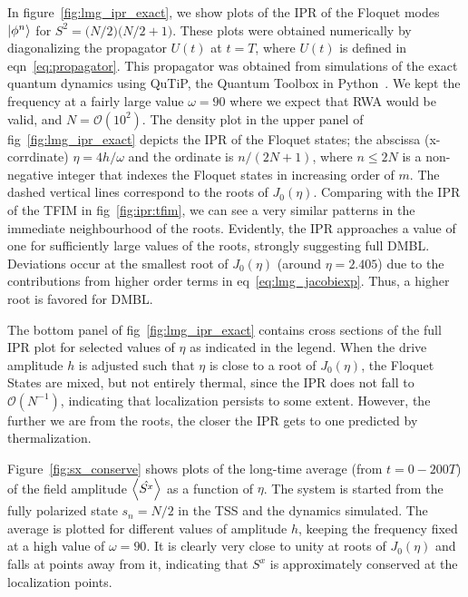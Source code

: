 \documentclass[%
reprint,
superscriptaddress,
amsmath,amssymb,
aps,
prb,
showkeys,
]{revtex4-2}
\begin{document}
	In figure~\ref{fig:lmg_ipr_exact}, we show plots of the IPR of the Floquet modes $\ket{\phi^n}$ for $S^2 = \big(N/2\big)\big(N/2 + 1\big)$.
	These plots were obtained numerically by diagonalizing the propagator $U(t)$ at $t=T$, where $U(t)$ is defined in eqn~\ref{eq:propagator}. This propagator was obtained from simulations of the exact quantum dynamics using QuTiP, the Quantum Toolbox in Python~\cite{qutip}. We kept the frequency at a fairly large value $\omega = 90$ where we expect that RWA would be valid, and $N=\mathcal{O}(10^2)$. The density plot in the upper panel of fig~\ref{fig:lmg_ipr_exact} depicts the IPR of the Floquet states; the abscissa (x-corrdinate)  $\eta=4h/\omega$ and the ordinate is $n/(2N+1)$, where $n\leq 2N$ is a non-negative integer that indexes the Floquet states in increasing order of $m$. The dashed vertical lines correspond to the roots of $J_0(\eta)$. Comparing with the IPR of the TFIM in fig~\ref{fig:ipr:tfim}, we can see a very similar patterns in the immediate neighbourhood of the roots. Evidently, the IPR approaches a value of one for sufficiently large values of the roots, strongly suggesting full DMBL. Deviations occur at the smallest root of $J_0(\eta)$ (around $\eta = 2.405$) due to the contributions from higher order terms in eq~\ref{eq:lmg_jacobiexp}. Thus, a higher root is favored for DMBL.
	
	The bottom panel of fig~\ref{fig:lmg_ipr_exact} contains cross sections of the full IPR plot for selected values of $\eta$ as indicated in the legend. When the drive amplitude $h$ is adjusted such that $\eta$ is close to a root of $J_0(\eta)$, the Floquet States are mixed, but not entirely thermal, since the IPR does not fall to $\mathcal{O}(N^{-1})$, indicating that localization persists to some extent. However, the further we are from the roots, the closer the IPR gets to one predicted by thermalization.
	
	Figure~\ref{fig:sx_conserve} shows plots of the long-time average (from $t=0-200T$) of the field amplitude $\expval{\hat{S^x}}$ as a function of $\eta$. The system is started from the fully polarized state $s_n=N/2$ in the TSS and the dynamics simulated. The average is plotted for different values of amplitude $h$, keeping the frequency fixed at a high value of $\omega=90$. It is clearly very close to unity at roots of $J_0(\eta)$ and falls at points away from it, indicating that $S^x$ is approximately conserved at the localization points.
	
\end{document}
